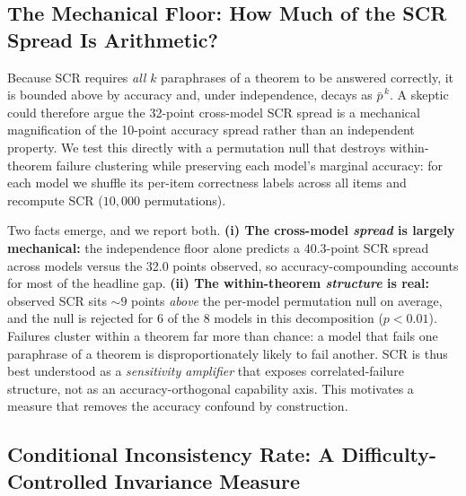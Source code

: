 \documentclass{article}
\begin{document}
\subsection{The Mechanical Floor: How Much of the SCR Spread Is Arithmetic?}
\label{sec:mechanical}

Because SCR requires \emph{all} $k$ paraphrases of a theorem to be answered correctly, it is bounded above by accuracy and, under independence, decays as $\bar p^{\,k}$. A skeptic could therefore argue the 32-point cross-model SCR spread is a mechanical magnification of the 10-point accuracy spread rather than an independent property. We test this directly with a permutation null that destroys within-theorem failure clustering while preserving each model's marginal accuracy: for each model we shuffle its per-item correctness labels across all items and recompute SCR ($10{,}000$ permutations).

Two facts emerge, and we report both. \textbf{(i) The cross-model \emph{spread} is largely mechanical:} the independence floor alone predicts a 40.3-point SCR spread across models versus the 32.0 points observed, so accuracy-compounding accounts for most of the headline gap. \textbf{(ii) The within-theorem \emph{structure} is real:} observed SCR sits ${\sim}9$ points \emph{above} the per-model permutation null on average, and the null is rejected for 6 of the 8 models in this decomposition ($p<0.01$). Failures cluster within a theorem far more than chance: a model that fails one paraphrase of a theorem is disproportionately likely to fail another. SCR is thus best understood as a \emph{sensitivity amplifier} that exposes correlated-failure structure, not as an accuracy-orthogonal capability axis. This motivates a measure that removes the accuracy confound by construction.

\subsection{Conditional Inconsistency Rate: A Difficulty-Controlled Invariance Measure}
\label{sec:cir}
\end{document}

